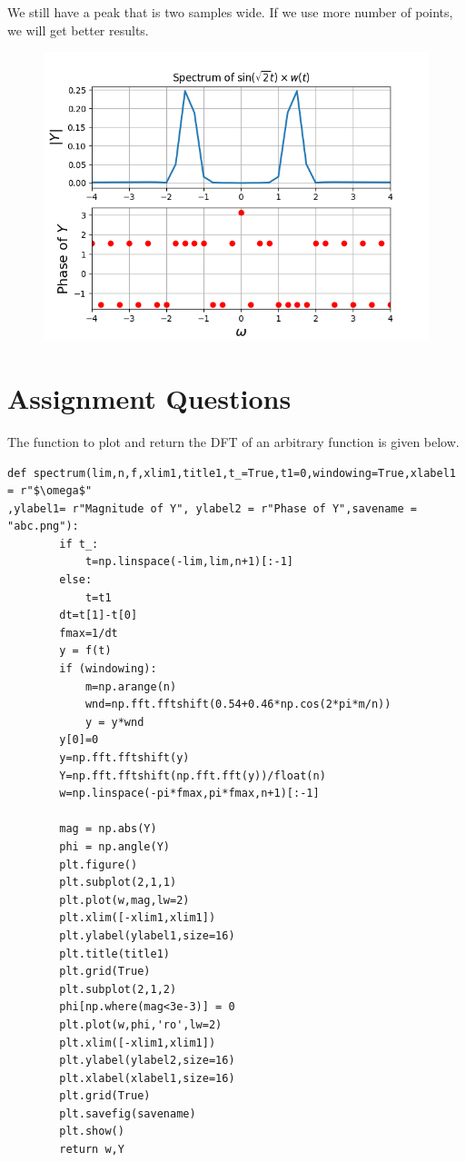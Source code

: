\documentclass[11pt, a4paper]{article}
\begin{document}
We still have a peak that is two samples wide. If we use more number of points, we will get better results.

\begin{figure}[!tbh]
\centering
\includegraphics[scale=0.65]{assgn10_plot7.png} 
\label{fig7}
\end{figure} 

\section*{Assignment Questions}

The function to plot and return the DFT of an arbitrary function is given below.
\begin{verbatim}
def spectrum(lim,n,f,xlim1,title1,t_=True,t1=0,windowing=True,xlabel1 = r"$\omega$"
,ylabel1= r"Magnitude of Y", ylabel2 = r"Phase of Y",savename = "abc.png"):
		if t_:
			t=np.linspace(-lim,lim,n+1)[:-1]
		else:
			t=t1
		dt=t[1]-t[0]
		fmax=1/dt
		y = f(t)
		if (windowing):
			m=np.arange(n)
			wnd=np.fft.fftshift(0.54+0.46*np.cos(2*pi*m/n))
			y = y*wnd
		y[0]=0
		y=np.fft.fftshift(y)
		Y=np.fft.fftshift(np.fft.fft(y))/float(n)
		w=np.linspace(-pi*fmax,pi*fmax,n+1)[:-1]
		
		mag = np.abs(Y)
		phi = np.angle(Y)
		plt.figure()
		plt.subplot(2,1,1)
		plt.plot(w,mag,lw=2)
		plt.xlim([-xlim1,xlim1])
		plt.ylabel(ylabel1,size=16)
		plt.title(title1)
		plt.grid(True)
		plt.subplot(2,1,2)
		phi[np.where(mag<3e-3)] = 0
		plt.plot(w,phi,'ro',lw=2)
		plt.xlim([-xlim1,xlim1])
		plt.ylabel(ylabel2,size=16)
		plt.xlabel(xlabel1,size=16)
		plt.grid(True)
		plt.savefig(savename)
		plt.show()
		return w,Y
\end{verbatim}
\end{document}
